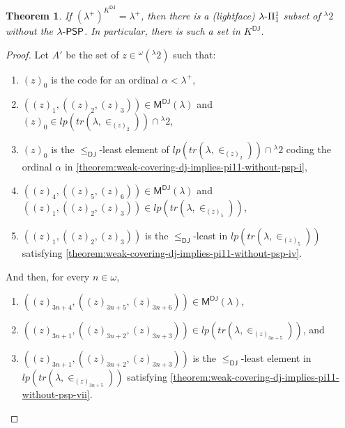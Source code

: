 \documentclass{amsart}
\numberwithin{equation}{section}
\def\hyp{{\hbox{-}}}
\newtheorem{theorem}{Theorem}[section]
\theoremstyle{definition}
\theoremstyle{remark}
\begin{document}
\begin{theorem}\label{theorem:weak-covering-dj-implies-pi11-without-psp} If $(\lambda^{+})^{K^{\mathsf{DJ}}}=\lambda^{+}$, then there is a \emph{(lightface)} $\lambda\hyp\Pi^1_1$ subset of ${}^{\lambda}2$ without the $\lambda\hyp\mathsf{PSP}$. In particular, there is such a set in $K^{\mathsf{DJ}}$. 
\end{theorem}
\begin{proof}
 
    Let $A'$ be the set of $z\in{}^{\omega}({}^{\lambda}2)$ such that: 
    \begin{enumerate}
        \item $(z)_0$ is the code for an ordinal $\alpha<\lambda^{+}$,\label{theorem:weak-covering-dj-implies-pi11-without-psp-i}
        \item $((z)_1,((z)_2,(z)_3))\in\mathsf{M^{DJ}}(\lambda)$ and $(z)_0\in lp(tr(\lambda,\in_{(z)_{2}}))\cap {}^{\lambda}2$,\label{theorem:weak-covering-dj-implies-pi11-without-psp-ii}
        \item $(z)_{0}$ is the $\leq_{\mathsf{DJ}}$-least element of $lp(tr(\lambda,\in_{(z)_{2}}))\cap{}^{\lambda}2$ coding the ordinal $\alpha$ in \eqref{theorem:weak-covering-dj-implies-pi11-without-psp-i},\label{theorem:weak-covering-dj-implies-pi11-without-psp-iii}
        \item $((z)_{4},((z)_5,(z)_6))\in\mathsf{M^{DJ}}(\lambda)$ and $((z)_1,((z)_2,(z)_3))\in lp(tr(\lambda,\in_{(z)_{5}}))$,\label{theorem:weak-covering-dj-implies-pi11-without-psp-iv}
        \item $((z)_{1},((z)_2,(z)_3))$ is the $\leq_{\mathsf{DJ}}$-least in $lp(tr(\lambda,\in_{(z)_{5}}))$ satisfying \eqref{theorem:weak-covering-dj-implies-pi11-without-psp-iv}.\label{theorem:weak-covering-dj-implies-pi11-without-psp-v}
    \end{enumerate}
    And then, for every $n\in\omega$,
    \begin{enumerate}[resume]
        \item $((z)_{3n+4},((z)_{3n+5},(z)_{3n+6}))\in\mathsf{M^{DJ}}(\lambda)$,\label{theorem:weak-covering-dj-implies-pi11-without-psp-vi}
		\item $((z)_{3n+1},((z)_{3n+2},(z)_{3n+3}))\in lp(tr(\lambda,\in_{(z)_{3n+5}}))$, and\label{theorem:weak-covering-dj-implies-pi11-without-psp-vii}
		\item
		$((z)_{3n+1},((z)_{3n+2},(z)_{3n+3}))$ is the $\leq_{\mathsf{DJ}}$-least element in $lp(tr(\lambda,\in_{(z)_{3n+5}}))$ satisfying \eqref{theorem:weak-covering-dj-implies-pi11-without-psp-vii}.\label{theorem:weak-covering-dj-implies-pi11-without-psp-viii}
    \end{enumerate}


\end{proof}
\end{document}
